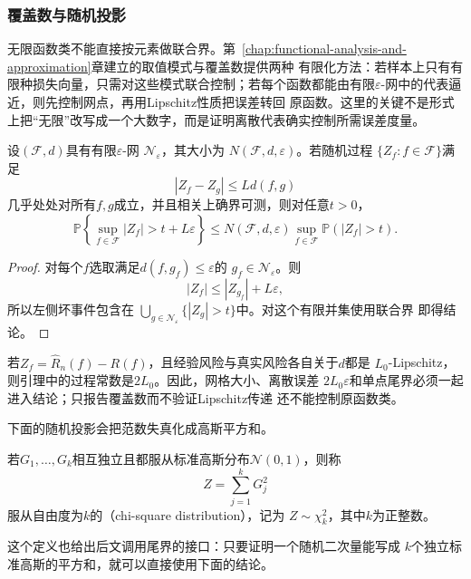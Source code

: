 \subsubsection{覆盖数与随机投影}

无限函数类不能直接按元素做联合界。第~\ref{chap:functional-analysis-and-approximation}章建立的取值模式与覆盖数提供两种
有限化方法：若样本上只有有限种损失向量，只需对这些模式联合控制；若每个函数都能由有限\(\varepsilon\)-网中的代表逼近，则先控制网点，再用Lipschitz性质把误差转回
原函数。这里的关键不是形式上把“无限”改写成一个大数字，而是证明离散代表确实控制所需误差度量。

\begin{lemma}[覆盖数的有限网控制]
  \label{lem:probability-covering-finite-net}
  设\((\mathcal{F},d)\)具有有限\(\varepsilon\)-网
  \(\mathcal{N}_\varepsilon\)，其大小为
  \(N(\mathcal{F},d,\varepsilon)\)。若随机过程
  \(\{Z_f:f\in\mathcal{F}\}\)满足
  \[
    |Z_f-Z_g|\leq Ld(f,g)
  \]
  几乎处处对所有\(f,g\)成立，并且相关上确界可测，则对任意\(t>0\)，
  \begin{equation}
    \mathbb{P}\left\{
      \sup_{f\in\mathcal{F}}|Z_f|>t+L\varepsilon
    \right\}
    \leq
    N(\mathcal{F},d,\varepsilon)
    \sup_{f\in\mathcal{F}}\mathbb{P}(|Z_f|>t).
    \label{eq:probability-covering-finite-net}
  \end{equation}
\end{lemma}

\begin{proof}
对每个\(f\)选取满足\(d(f,g_f)\leq\varepsilon\)的
\(g_f\in\mathcal{N}_\varepsilon\)。则
\[
  |Z_f|\leq |Z_{g_f}|+L\varepsilon,
\]
所以左侧坏事件包含在
\(\bigcup_{g\in\mathcal{N}_\varepsilon}\{|Z_g|>t\}\)中。对这个有限并集使用联合界
即得结论。
\end{proof}

若\(Z_f=\widehat R_n(f)-R(f)\)，且经验风险与真实风险各自关于\(d\)都是
\(L_0\)-Lipschitz，则引理中的过程常数是\(2L_0\)。因此，网格大小、离散误差
\(2L_0\varepsilon\)和单点尾界必须一起进入结论；只报告覆盖数而不验证Lipschitz传递
还不能控制原函数类。

下面的随机投影会把范数失真化成高斯平方和。
\begin{definition}[卡方分布]
  \label{def:probability-chi-square-distribution}
若\(G_1,\ldots,G_k\)相互独立且都服从标准高斯分布\(\mathcal N(0,1)\)，则称
\[
  Z=\sum_{j=1}^{k}G_j^2
\]
服从自由度为\(k\)的（chi-square distribution），记为
\(Z\sim\chi_k^2\)，其中\(k\)为正整数。
\end{definition}
这个定义也给出后文调用尾界的接口：只要证明一个随机二次量能写成
\(k\)个独立标准高斯的平方和，就可以直接使用下面的结论。


